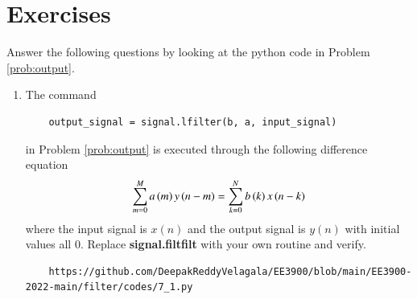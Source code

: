 \documentclass[journal,12pt,twocolumn]{IEEEtran}
\renewcommand\thesection{\arabic{section}}
\begin{document}
\section{Exercises}
Answer the following questions by looking at the python code in Problem \ref{prob:output}.
\begin{enumerate}[label=\thesection.\arabic*]
\item
The command
\begin{lstlisting}
	output_signal = signal.lfilter(b, a, input_signal)
	\end{lstlisting}
in Problem \ref{prob:output} is executed through the following difference equation
\begin{equation}
\label{eq:iir_filter_gen}
 \sum _{m=0}^{M}a\left(m\right)y\left(n-m\right)=\sum _{k=0}^{N}b\left(k\right)x\left(n-k\right)
\end{equation}
%
where the input signal is $x(n)$ and the output signal is $y(n)$ with initial values all 0. Replace
\textbf{signal.filtfilt} with your own routine and verify.
%
\solution 
\begin{lstlisting}
    https://github.com/DeepakReddyVelagala/EE3900/blob/main/EE3900-2022-main/filter/codes/7_1.py
\end{lstlisting}


\end{enumerate}
\end{document}

